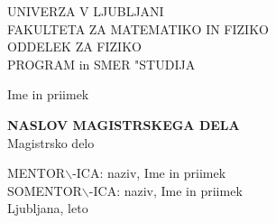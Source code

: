 
\def\epsfg#1#2{\epsfig{file=#1.eps,width=#2}}
\def\legendamp#1#2{\vbox{\hsize=#1\caption{\small #2}}}

\setcounter{topnumber}{4}
\setcounter{bottomnumber}{4}
\setcounter{totalnumber}{5}
\renewcommand{\topfraction}{0.99}
\renewcommand{\bottomfraction}{0.99}
\renewcommand{\textfraction}{0.0}
\setlength{\tabcolsep}{10pt}
\renewcommand{\arraystretch}{1.5}

\def\bi#1{\hbox{\boldmath{$#1$}}}
\let\oldvec\vec
\def\vec#1{\mbox{\boldmath$#1$}}
\def\pol{{\textstyle{1\over2}}}
\def\svec#1{\mbox{{\scriptsize \boldmath$#1$}}}




\pagestyle{empty}
\begin{center}

{\large UNIVERZA V LJUBLJANI\\
FAKULTETA ZA MATEMATIKO IN FIZIKO\\
ODDELEK ZA FIZIKO\\
PROGRAM in SMER "STUDIJA\\}


\vspace{4cm}


{\Large Ime in priimek\\}

\vspace{10mm}

{\bf \Large NASLOV MAGISTRSKEGA DELA}\\
\vspace{5mm}
{\large Magistrsko delo}\\




\vfill



{\large MENTOR$\backslash$-ICA: naziv, Ime in priimek\\
SOMENTOR$\backslash$-ICA: naziv, Ime in priimek\\


\vspace{2cm}
Ljubljana, leto}

\end{center}

